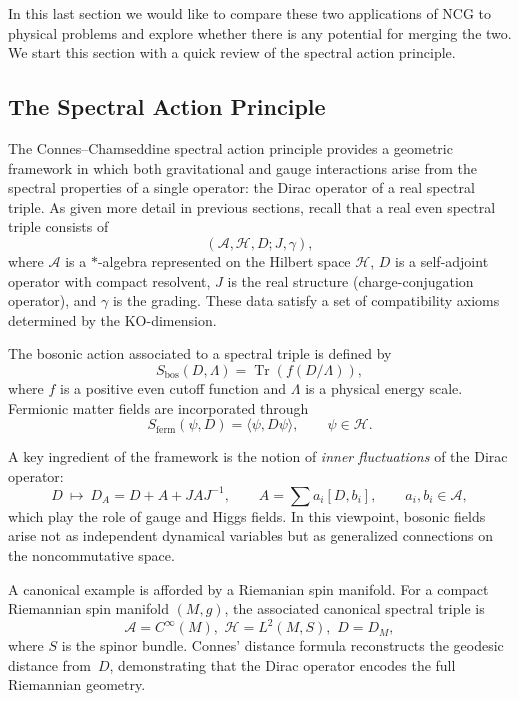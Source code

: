 \documentclass[11pt]{article}
\theoremstyle{plain}
\begin{document}
In this last section we would like to compare these two applications of NCG to 
physical problems and explore whether there is any potential for merging the 
two. We start this section with a quick review of the spectral action 
principle.






\subsection*{The Spectral Action Principle}

The Connes--Chamseddine spectral action principle \cite{Spectral action}
provides a geometric framework in which both gravitational and gauge
interactions arise from the spectral properties of a single operator: the Dirac
operator of a real spectral triple. As given more detail in previous sections, recall that a real even spectral triple consists of
\[
(\mathcal{A},\mathcal{H},D;J,\gamma),
\]
where $\mathcal{A}$ is a $*$-algebra represented on the Hilbert space
$\mathcal{H}$, $D$ is a self-adjoint operator with compact resolvent, $J$ is
the real structure (charge-conjugation operator), and $\gamma$ is the grading.
These data satisfy a set of compatibility axioms determined by the
KO-dimension.

The bosonic action associated to a spectral triple is defined by
\[
S_{\mathrm{bos}}(D,\Lambda)
= \operatorname{Tr}\!\left(f(D/\Lambda)\right),
\]
where $f$ is a positive even cutoff function and $\Lambda$ is a physical energy
scale.  Fermionic matter fields are incorporated through
\[
S_{\mathrm{ferm}}(\psi,D)=\langle\psi, D \psi\rangle,
\qquad \psi\in \mathcal{H}.
\]

A key ingredient of the framework is the notion of \emph{inner fluctuations} of
the Dirac operator:
\[
D ~\longmapsto~ D_{A}=D + A + JAJ^{-1},
\qquad 
A=\sum a_{i}[D,b_{i}],\qquad a_{i},b_{i}\in\mathcal{A},
\]
which play the role of gauge and Higgs fields.
In this viewpoint, bosonic fields arise not as independent dynamical
variables but as generalized connections on the noncommutative space.

\medskip

A canonical example is afforded by a Riemanian spin manifold. 
For a compact Riemannian spin manifold $(M,g)$, the associated canonical
spectral triple is
\[
\mathcal{A}=C^{\infty}(M),\, \, 
\mathcal{H}=L^{2}(M,S), \, \, 
D=D_{M},
\]
where $S$ is the spinor bundle.
Connes’ distance formula reconstructs the geodesic distance from~$D$,
demonstrating that the Dirac operator encodes the full Riemannian geometry.
\end{document}
